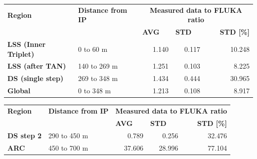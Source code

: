 \documentclass[encoding=utf8,british]{tumphthesis}
\begin{document}
\begin{table}[H]
\begin{subtable}{1.0\textwidth}
\begin{tabular}{|l|l|rrr|}
\hline
\rowcolor[HTML]{CFE2F3} 
\textbf{Region}              & \textbf{Distance from IP} & \multicolumn{3}{c|}{\cellcolor[HTML]{CFE2F3}\textbf{Measured data to FLUKA ratio}}                                             \\
                             &               & \multicolumn{1}{l}{\textbf{AVG}} & \multicolumn{1}{l}{\textbf{STD}} & \multicolumn{1}{r|}{\textbf{STD {[}\%{]}}} \\ \hline
\rowcolor[HTML]{CFE2F3} 
\textbf{LSS (Inner Triplet)} & 0 to 60 m     & 1.140                             & 0.117                            & 10.248                                    \\
\textbf{LSS (after TAN)}     & 140 to 269 m  & 1.251                             & 0.103                            & 8.225                                     \\
\rowcolor[HTML]{CFE2F3} 
\textbf{DS (single step)}    & 269 to 348 m  & 1.434                             & 0.444                            & 30.965                                    \\ \hline
\textbf{Global}              & 0 to 348 m    & 1.213                             & 0.108                            & 8.917                                     \\ \hline
\end{tabular}
\end{subtable}

    \bigskip

    \hfill

    \begin{subtable}{1.0\textwidth}
    \centering
    \label{tab:agreement-levels-BLMs-2018-ip1-2step}

\begin{tabular}{|l|l|rrr|}
\hline
\rowcolor[HTML]{CFE2F3} 
\textbf{Region}    & \textbf{Distance from IP} & \multicolumn{3}{c|}{\cellcolor[HTML]{CFE2F3}\textbf{Measured data to FLUKA ratio}}                                             \\
                   &               & \multicolumn{1}{l}{\textbf{AVG}} & \multicolumn{1}{l}{\textbf{STD}} & \multicolumn{1}{r|}{\textbf{STD {[}\%{]}}} \\ \hline
\rowcolor[HTML]{CFE2F3} 
\textbf{DS step 2} & 290 to 450 m  & 0.789                             & 0.256                            & 32.476                                    \\
\textbf{ARC}       & 450 to 700 m  & 37.606                            & 28.996                           & 77.104                                    \\ \hline
\end{tabular}
\end{subtable}


\end{table}
\end{document}
